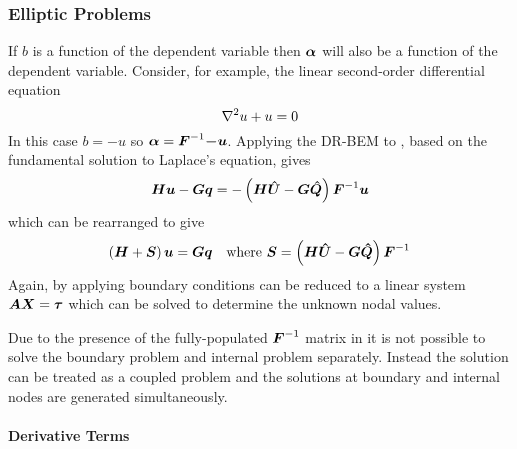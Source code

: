 \subsubsection{Elliptic Problems}

If $b$ is a function of the dependent variable then $\vect{\alpha}$ will also 
be a function of the dependent variable. Consider, for example, the 
linear second-order differential equation
\begin{equation}
  \laplacian{}{u} + u = 0
\label{eq:helmtypeeqn}
\end{equation}
In this case $b = -u$ so $\vect{\alpha} = \matr{F}^{-1} \vect{-u}$.
Applying the DR-BEM to , based on the fundamental
solution to Laplace's equation, gives
\begin{equation}
  \matr{H} \vect{u} - \matr{G}\vect{q} = - \pbrac{\matr{H} \matr{\hat{U}} -
    \matr{G} \matr{\hat{Q}}} \matr{F}^{-1} \vect{u}
\end{equation}
which can be rearranged to give 
\begin{equation}
  \pbrac{\matr{H} + \matr{S}} \vect{u} = \matr{G}
  \vect{q}\quad\text{where }\matr{S} = \pbrac{\matr{H} \matr{\hat{U}}
    - \matr{G} \matr{\hat{Q}}} \matr{F}^{-1}
\label{eq:drmpotential}
\end{equation}
Again, by applying boundary conditions  can be reduced 
to a linear system $\matr{A} \matr{x} = \matr{\tau}$ which can be solved to
determine the unknown nodal values.

Due to the presence 
of the fully-populated $\matr{F}^{-1}$ matrix in 
 it is not possible to solve the boundary problem and internal 
problem separately. Instead the solution can be treated as a coupled 
problem and the solutions at boundary and internal nodes are generated 
simultaneously.

\paragraph{Derivative Terms}
\label{sec:deriv}

